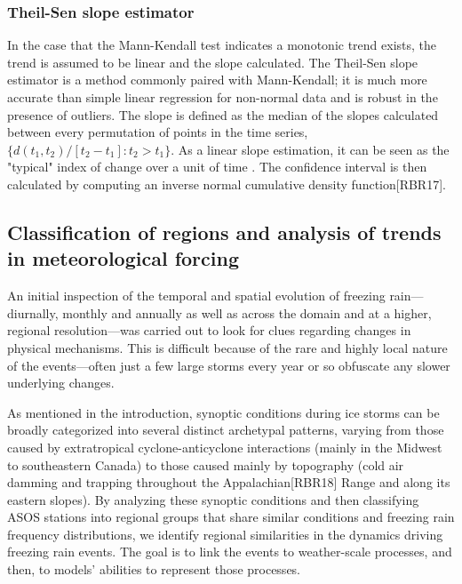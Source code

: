 \documentclass[twocol]{ametsoc}
\begin{document}
\subsubsection{Theil-Sen slope estimator}

In the case that the Mann-Kendall test indicates a monotonic trend exists, the trend is assumed to be linear and the slope calculated. The Theil-Sen slope estimator is a method commonly paired with Mann-Kendall; it is much more accurate than simple linear regression for non-normal data and is robust in the presence of outliers. The slope is defined as the median of the slopes calculated between every permutation of points in the time series, $\{d(t_1,t_2)/[t_2-t_1]:t_2>t_1\}$. As a linear slope estimation, it can be seen as the "typical" index of change over a unit of time \citep{chandler2011statistical}. The confidence interval is then calculated by computing an inverse normal cumulative density function[RBR17].



\subsection{Classification of regions and analysis of trends in meteorological forcing}

An initial inspection of the temporal and spatial evolution of freezing rain---diurnally, monthly and annually as well as across the domain and at a higher, regional resolution---was carried out to look for clues regarding changes in physical mechanisms.  This is difficult because of the rare and highly local nature of the events---often just a few large storms every year or so obfuscate any slower underlying changes.



As mentioned in the introduction, synoptic conditions during ice storms can be broadly categorized into several distinct archetypal patterns, varying from those caused by extratropical cyclone-anticyclone interactions (mainly in the Midwest to southeastern Canada) to those caused mainly by topography (cold air damming and trapping throughout the Appalachian[RBR18] Range and along its eastern slopes). By analyzing these synoptic conditions and then classifying ASOS stations into regional groups that share similar conditions and freezing rain frequency distributions, we identify regional similarities in the dynamics driving freezing rain events. The goal is to link the events to weather-scale processes, and then, to models' abilities to represent those processes.
\end{document}
